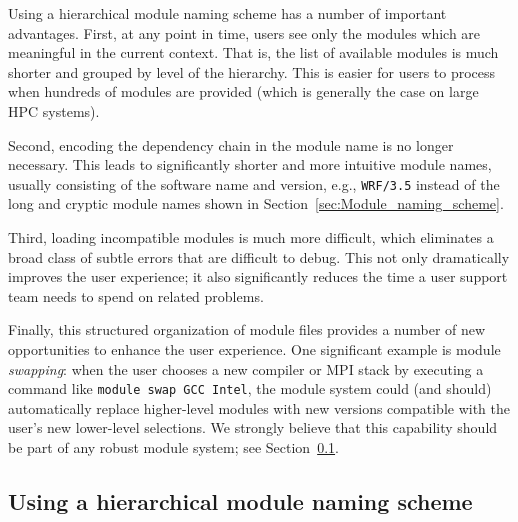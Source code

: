
Using a hierarchical module naming scheme has a number of important
advantages. First, at any point in time, users see only the
modules which are meaningful in the current context. That is, the list of
available modules is much shorter and grouped by level of the hierarchy. This is easier for users to process when hundreds of modules are
provided (which is generally the case on large HPC systems).

Second, encoding the dependency chain in the module name is no longer
necessary. This leads to significantly shorter and more intuitive
module names, usually consisting of the software name and version, e.g.,
\texttt{\small WRF/3.5} instead of the long and cryptic module names shown in
Section~\ref{sec:Module_naming_scheme}.

Third, loading incompatible modules is much more difficult,
which eliminates a broad class of subtle errors that
are difficult to debug. This not only dramatically improves the user experience; it
also significantly reduces the time a user support team needs to spend on related
problems.

Finally, this structured organization of module files provides
a number of new opportunities to enhance the user experience. One significant
example is module \emph{swapping}: when the user chooses a new compiler or MPI
stack by executing a command like \texttt{\small module swap GCC Intel}, the module
system could (and should) automatically replace higher-level modules with new
versions compatible with the user's new lower-level selections.
We strongly believe
that this capability should be part of any robust module system; see
Section~\ref{sec:using_a_hierarchy}.


\subsection{Using a hierarchical module naming scheme}
\label{sec:using_a_hierarchy}

